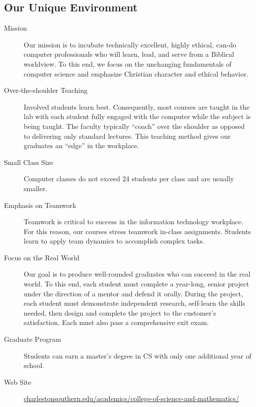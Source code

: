 \subsection{Our Unique Environment}
\begin{description}
	\item[Mission] Our mission is to incubate technically excellent, highly ethical, can-do computer professionals who will learn, lead, and serve from a Biblical worldview. To this end, we focus on the unchanging fundamentals of computer science and emphasize Christian character and ethical behavior.
	\item[Over-the-shoulder Teaching] Involved students learn best. Consequently, most courses are taught in the lab with each student fully engaged with the computer while the subject is being taught. The faculty typically “coach” over the shoulder as opposed to delivering only standard lectures. This teaching method gives our graduates an “edge” in the workplace.
	\item[Small Class Size] Computer classes do not exceed 24 students per class and are usually smaller.
	\item[Emphasis on Teamwork] Teamwork is critical to success in the information technology workplace. For this reason, our courses stress teamwork in-class assignments. Students learn to apply team dynamics to accomplish complex tasks.
	\item[Focus on the Real World] Our goal is to produce well-rounded graduates who can succeed in the real world.  To this end, each student must complete a year-long, senior project under the direction of a mentor and defend it orally. During the project, each student must demonstrate independent research, self-learn the skills needed, then design and complete the project to the customer’s satisfaction.  Each must also pass a comprehensive exit exam.
	\item[Graduate Program] Students can earn a master’s degree in CS with only one additional year of school.
	\item[Web Site] \href{https://www.charlestonsouthern.edu/academics/college-of-science-and-mathematics/}{charlestonsouthern.edu/academics/college-of-science-and-mathematics/}
\end{description}